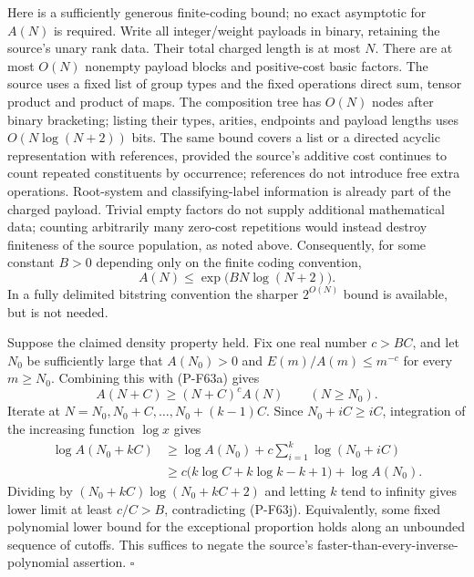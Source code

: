 Here is a sufficiently generous finite-coding bound; no exact
asymptotic for $A(N)$ is required.  Write all integer/weight
payloads in binary, retaining the source's unary rank data.
Their total charged length is at most $N$.  There are at most
$O(N)$ nonempty payload blocks and positive-cost basic factors.
The source uses a fixed list of group types and the fixed
operations direct sum, tensor product and product of maps.
The composition tree has $O(N)$ nodes after binary bracketing;
listing their types, arities, endpoints and payload lengths
uses $O(N\log(N+2))$ bits.  The same bound covers a list or a
directed acyclic representation with references, provided the
source's additive cost continues to count repeated constituents
by occurrence; references do not introduce free extra operations.
Root-system
and classifying-label information is already part of the
charged payload.  Trivial empty factors do not supply
additional mathematical data; counting arbitrarily many
zero-cost repetitions would instead destroy finiteness of the
source population, as noted above.  Consequently, for some
constant $B>0$ depending only on the finite coding convention,
\[
            A(N)\le\exp\bigl(BN\log(N+2)\bigr).
                                                        \tag{P-F63j}
\]
In a fully delimited bitstring convention the sharper
$2^{O(N)}$ bound is available, but is not needed.

Suppose the claimed density property held.  Fix one real
number $c>BC$, and let $N_0$ be sufficiently large that
$A(N_0)>0$ and
$E(m)/A(m)\le m^{-c}$ for every $m\ge N_0$.
Combining this with (P-F63a) gives
\[
       A(N+C)\ge (N+C)^c A(N)\qquad(N\ge N_0).
                                                        \tag{P-F63k}
\]
Iterate at $N=N_0,N_0+C,\ldots,N_0+(k-1)C$.
Since $N_0+iC\ge iC$, integration of the increasing function
$\log x$ gives
\[
 \begin{split}
 \log A(N_0+kC)
 &\ge\log A(N_0)+c\sum_{i=1}^k\log(N_0+iC)\\
 &\ge c\bigl(k\log C+k\log k-k+1\bigr)+\log A(N_0).
 \end{split}                                           \tag{P-F63l}
\]
Dividing by $(N_0+kC)\log(N_0+kC+2)$ and letting $k$ tend
to infinity gives lower limit at least $c/C>B$,
contradicting (P-F63j).  Equivalently, some fixed polynomial
lower bound for the exceptional proportion holds along an
unbounded sequence of cutoffs.  This suffices to negate the
source's faster-than-every-inverse-polynomial assertion.
\hfill$\square$

